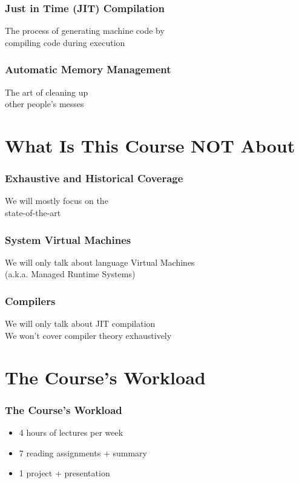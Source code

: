 \documentclass[
14pt,
aspectratio=169,
usenames,
dvipsnames,
x11names]{beamer}
\begin{document}
\begin{frame}
  \frametitle{Just in Time (JIT) Compilation}
  \centering
  The process of generating machine code by\\
  compiling code \alert{during execution}
\end{frame}

\begin{frame}
  \frametitle{Automatic Memory Management}
  \centering
  The \alert{art} of cleaning up\\
  other people's messes
\end{frame}

\section{What Is This Course NOT About}

\begin{frame}
  \frametitle{Exhaustive and Historical Coverage}
  \centering
  We will mostly focus on the\\ \alert{state-of-the-art}
\end{frame}

\begin{frame}
  \frametitle{System Virtual Machines}
  \centering
  We will only talk about \alert{language} Virtual Machines\\
  (a.k.a. Managed Runtime Systems)
\end{frame}

\begin{frame}
  \frametitle{Compilers}
  \centering
  We will only talk about \alert{JIT} compilation\\[1ex]
  We \alert{won't} cover compiler theory exhaustively
\end{frame}

\section{The Course's Workload}

\begin{frame}
  \frametitle{The Course's Workload}
  \begin{itemize}[<+->] \setlength{\itemsep}{\fill}
  \item \alert{4 hours} of lectures per week
  \item \alert{7} reading assignments + summary
  \item \alert{1} project + presentation
  \end{itemize}
\end{frame}
\end{document}
